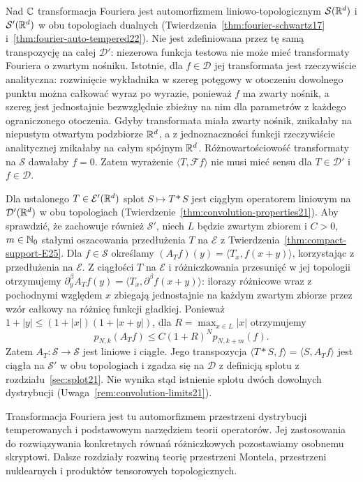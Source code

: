 \begin{uwaga}
\label{rem:fourier-conv25}
Nad $\mathbb C$ transformacja Fouriera jest automorfizmem
liniowo-topologicznym $\mathcal S(\mathbb R^d)$ i
$\mathcal S'(\mathbb R^d)$ w obu topologiach dualnych
(Twierdzenia~\ref{thm:fourier-schwartz17}
i~\ref{thm:fourier-auto-tempered22}).
Nie jest zdefiniowana przez tę samą transpozycję
na całej $\mathcal D'$: niezerowa funkcja testowa
nie może mieć transformaty Fouriera o zwartym nośniku.
Istotnie, dla $f\in\mathcal D$ jej transformata
jest rzeczywiście analityczna: rozwinięcie wykładnika
w szereg potęgowy w otoczeniu dowolnego punktu
można całkować wyraz po wyrazie, ponieważ $f$ ma
zwarty nośnik, a szereg jest jednostajnie bezwzględnie
zbieżny na nim dla parametrów z każdego ograniczonego
otoczenia. Gdyby transformata miała zwarty nośnik,
znikałaby na niepustym otwartym podzbiorze $\mathbb R^d$,
a z jednoznaczności funkcji rzeczywiście analitycznej
znikałaby na całym spójnym $\mathbb R^d$.
Różnowartościowość transformaty na $\mathcal S$
dawałaby $f=0$. Zatem wyrażenie
$\langle T,\mathcal F f\rangle$ nie musi mieć sensu
dla $T\in\mathcal D'$ i $f\in\mathcal D$.

Dla ustalonego $T\in\mathcal E'(\mathbb R^d)$ splot
$S\mapsto T*S$ jest ciągłym operatorem liniowym
na $\mathcal D'(\mathbb R^d)$ w obu topologiach
(Twierdzenie~\ref{thm:convolution-properties21}).
Aby sprawdzić, że zachowuje również $\mathcal S'$,
niech $L$ będzie zwartym zbiorem i $C>0$, $m\in\mathbb N_0$
stałymi oszacowania przedłużenia $T$ na $\mathcal E$
z Twierdzenia~\ref{thm:compact-support-E25}.
Dla $f\in\mathcal S$ określamy
$(A_Tf)(y)=\langle T_x,f(x+y)\rangle$,
korzystając z przedłużenia na $\mathcal E$.
Z ciągłości $T$ na $\mathcal E$ i różniczkowania
przesunięć w jej topologii otrzymujemy
$\partial_y^\beta A_T f(y)=
\langle T_x,\partial^\beta f(x+y)\rangle$:
ilorazy różnicowe wraz z pochodnymi względem $x$
zbiegają jednostajnie na każdym zwartym zbiorze
przez wzór całkowy na różnicę funkcji gładkiej.
Ponieważ $1+|y|\le(1+|x|)(1+|x+y|)$, dla
$R=\max_{x\in L}|x|$ otrzymujemy
\[
 p_{N,k}(A_Tf)\le C(1+R)^N p_{N,k+m}(f).
\]
Zatem $A_T:\mathcal S\to\mathcal S$ jest liniowe
i ciągłe. Jego transpozycja
$\langle T*S,f\rangle=\langle S,A_Tf\rangle$
jest ciągła na $\mathcal S'$ w obu topologiach
i zgadza się na $\mathcal D$ z definicją splotu
z rozdziału~\ref{sec:splot21}.
Nie wynika stąd istnienie splotu dwóch dowolnych
dystrybucji (Uwaga~\ref{rem:convolution-limits21}).
\end{uwaga}

\begin{uwaga}
\label{rem:scope22}
Transformacja Fouriera jest tu automorfizmem przestrzeni
dystrybucji temperowanych i podstawowym narzędziem teorii
operatorów. Jej zastosowania do rozwiązywania konkretnych
równań różniczkowych pozostawiamy osobnemu skryptowi.
Dalsze rozdziały rozwiną teorię przestrzeni Montela,
przestrzeni nuklearnych i produktów tensorowych topologicznych.
\end{uwaga}

